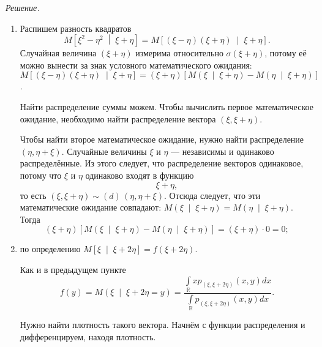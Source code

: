 \textit{Решение.}
\begin{enumerate}[label=\alph*)]
  \item Распишем разность квадратов
  $$M \left[ \xi^2 - \eta^2 \; \middle| \; \xi + \eta \right] =
    M \left[
      \left( \xi - \eta \right) \left( \xi + \eta \right) \; \middle| \; \xi + \eta
    \right].$$
  Случайная величина $ \left( \xi + \eta \right) $ измерима относительно
  $ \sigma \left( \xi + \eta \right) $,
  потому её можно вынести за знак условного математического ожидания:
  $M \left[
      \left( \xi - \eta \right) \left( \xi + \eta \right) \; \middle| \; \xi + \eta
    \right] =
    \left( \xi + \eta \right) \left[ M \left( \xi \; \middle| \; \xi + \eta \right) -
    M \left( \eta \; \middle| \; \xi + \eta \right) \right] $.

  Найти распределение суммы можем.
  Чтобы вычислить первое математическое ожидание,
  необходимо найти распределение вектора $ \left( \xi, \xi + \eta \right) $.

  Чтобы найти второе математическое ожидание,
  нужно найти распределение $ \left( \eta, \eta + \xi \right) $.
  Случайные величины $ \xi $ и $ \eta $ --- независимы и одинаково распределённые.
  Из этого следует, что распределение векторов одинаковое,
  потому что $ \xi $ и $ \eta $ одинаково входят в функцию
  $$ \xi + \eta,$$
  то есть
  $ \left( \xi, \xi + \eta \right) \sim \left( d \right) \,
    \left( \eta, \eta + \xi \right) $.
  Отсюда следует, что эти математические ожидание совпадают:
  $M \left( \xi \; \middle| \; \xi + \eta \right) =
    M \left( \eta \; \middle| \; \xi + \eta \right) $.
  Тогда
  $$ \left( \xi + \eta \right) \left[ M \left( \xi \; \middle| \; \xi + \eta \right) -
    M \left( \eta \; \middle| \; \xi + \eta \right) \right] =
    \left( \xi + \eta \right) \cdot 0 =
    0;$$
  \item по определению
  $M \left[ \xi \; \middle| \; \xi + 2 \eta \right] =
    f \left( \xi + 2 \eta \right) $.

  Как и в предыдущем пункте
  $$f \left( y \right) =
    M \left( \xi \; \middle| \; \xi + 2 \eta = y \right) =
    \frac{ \int \limits_{ \mathbb{R}} xp_{ \left( \xi, \xi + 2 \eta \right) } \left( x, y \right) dx}{ \int \limits_{ \mathbb{R}} p_{ \left( \xi, \xi + 2 \eta \right) } \left( x, y \right) dx}.$$

  Нужно найти плотность такого вектора.
  Начнём с функции распределения и дифференцируем, находя плотность.


\end{enumerate}
